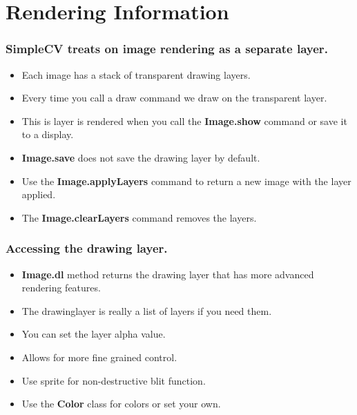 \documentclass{beamer}
\begin{document}
\section{Rendering Information}
\begin{frame}
\frametitle{SimpleCV treats on image rendering as a separate layer.}
\begin{itemize}
  \item Each image has a stack of transparent drawing layers. 
  \item Every time you call a draw command we draw on the transparent layer.
  \item This is layer is rendered when you call the
    \textbf{Image.show} command or save it to a display.
  \item \textbf{Image.save} does not save the drawing layer by default.
 \item Use the \textbf{Image.applyLayers} command to return a new
   image with the layer applied.
   \item The \textbf{Image.clearLayers} command removes the layers.
\end{itemize}
\end{frame}
\begin{frame}
\frametitle{Accessing the drawing layer.}
\begin{itemize}
  \item \textbf{Image.dl} method returns the drawing layer that has
      more advanced rendering features. 
  \item The drawinglayer is really a list of layers if you need them.
  \item You can set the layer alpha value. 
  \item Allows for more fine grained control.
  \item Use sprite for non-destructive blit function.
  \item Use the \textbf{Color} class for colors or set your own. 
\end{itemize}
\end{frame}
\end{document}
